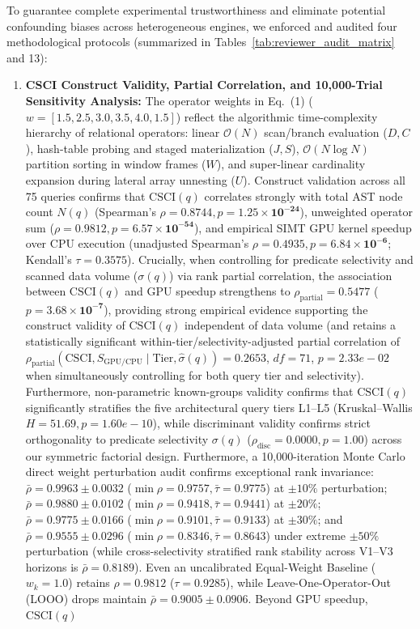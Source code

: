 \documentclass[10pt,a4paper]{article}
\begin{document}
To guarantee complete experimental trustworthiness and eliminate potential confounding biases across heterogeneous engines, we enforced and audited four methodological protocols (summarized in Tables~\ref{tab:reviewer_audit_matrix} and 13):
\begin{enumerate}[leftmargin=1.5em,itemsep=2pt]
    \item \textbf{CSCI Construct Validity, Partial Correlation, and 10,000-Trial Sensitivity Analysis:} The operator weights in Eq.~(1) ($w = [1.5, 2.5, 3.0, 3.5, 4.0, 1.5]$) reflect the algorithmic time-complexity hierarchy of relational operators: linear $\mathcal{O}(N)$ scan/branch evaluation ($D, C$), hash-table probing and staged materialization ($J, S$), $\mathcal{O}(N \log N)$ partition sorting in window frames ($W$), and super-linear cardinality expansion during lateral array unnesting ($U$). Construct validation across all 75 queries confirms that $\text{CSCI}(q)$ correlates strongly with total AST node count $N(q)$ (Spearman's $\rho = \mathbf{0.8744}, p = \mathbf{1.25 \times 10^{-24}}$), unweighted operator sum ($\rho = \mathbf{0.9812}, p = \mathbf{6.57 \times 10^{-54}}$), and empirical SIMT GPU kernel speedup over CPU execution (unadjusted Spearman's $\rho = \mathbf{0.4935}, p = \mathbf{6.84 \times 10^{-6}}$; Kendall's $\tau = \mathbf{0.3575}$). Crucially, when controlling for predicate selectivity and scanned data volume ($\sigma(q)$) via rank partial correlation, the association between $\text{CSCI}(q)$ and GPU speedup strengthens to $\rho_{\text{partial}} = \mathbf{0.5477}$ ($p = \mathbf{3.68 \times 10^{-7}}$), providing strong empirical evidence supporting the construct validity of $\text{CSCI}(q)$ independent of data volume (and retains a statistically significant within-tier/selectivity-adjusted partial correlation of $\rho_{\text{partial}}(\text{CSCI}, S_{\text{GPU/CPU}} \mid \text{Tier}, \hat{\sigma}(q)) = 0.2653$, $df=71$, $p=2.33e-02$ when simultaneously controlling for both query tier and selectivity). Furthermore, non-parametric known-groups validity confirms that $\text{CSCI}(q)$ significantly stratifies the five architectural query tiers L1--L5 (Kruskal--Wallis $H = 51.69, p = 1.60e-10$), while discriminant validity confirms strict orthogonality to predicate selectivity $\sigma(q)$ ($\rho_{\text{disc}} = 0.0000, p = 1.00$) across our symmetric factorial design. Furthermore, a 10,000-iteration Monte Carlo direct weight perturbation audit confirms exceptional rank invariance: $\bar{\rho} = \mathbf{0.9963} \pm 0.0032$ ($\min \rho = 0.9757, \bar{\tau}=0.9775$) at $\pm 10\%$ perturbation; $\bar{\rho} = \mathbf{0.9880} \pm 0.0102$ ($\min \rho = 0.9418, \bar{\tau}=0.9441$) at $\pm 20\%$; $\bar{\rho} = \mathbf{0.9775} \pm 0.0166$ ($\min \rho = 0.9101, \bar{\tau}=0.9133$) at $\pm 30\%$; and $\bar{\rho} = \mathbf{0.9555} \pm 0.0296$ ($\min \rho = 0.8346, \bar{\tau}=0.8643$) under extreme $\pm 50\%$ perturbation (while cross-selectivity stratified rank stability across V1--V3 horizons is $\bar{\rho}=0.8189$). Even an uncalibrated Equal-Weight Baseline ($w_k = 1.0$) retains $\rho = \mathbf{0.9812}$ ($\tau = 0.9285$), while Leave-One-Operator-Out (LOOO) drops maintain $\bar{\rho} = \mathbf{0.9005} \pm 0.0906$. Beyond GPU speedup, $\text{CSCI}(q)$ 
\end{enumerate}
\end{document}
